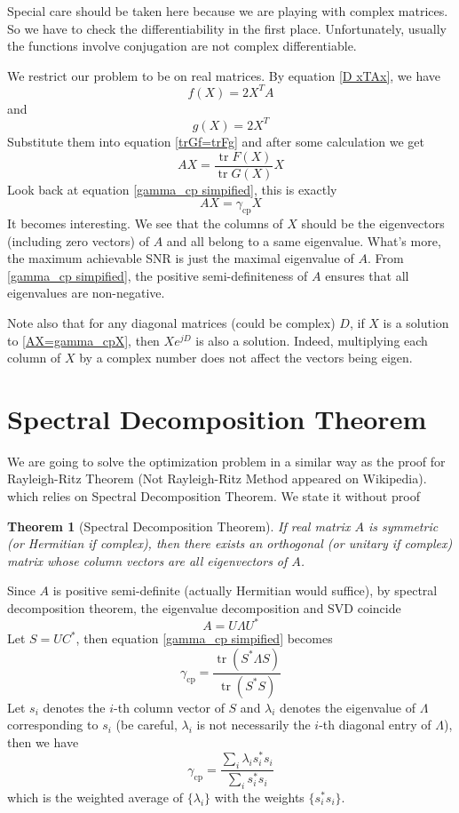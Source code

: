 \documentclass[12pt]{article}
\newtheorem{theorem}{Theorem}
\theoremstyle{definition}
\DeclareMathOperator{\tr}{tr} %
\begin{document}
Special care should be taken here because we are playing with complex matrices. So we have to check the differentiability in the first place. Unfortunately, usually the functions involve conjugation are not complex differentiable. 

We restrict our problem to be on real matrices. By equation \ref{D xTAx}, we have
$$
f(X)=2X^TA
$$
and $$g(X)=2X^T$$
Substitute them into equation \ref{trGf=trFg} and after some calculation we get
$$AX=\frac{\tr F(X)}{\tr G(X)}X$$
Look back at equation \ref{gamma_cp simpified}, this is exactly
\begin{equation}
	AX=\gamma_{\mbox{cp}}X\label{AX=gamma_cpX}
\end{equation}
It becomes interesting. We see that the columns of $X$ should be the eigenvectors (including zero vectors) of $A$ and all belong to a same eigenvalue. What's more, the maximum achievable SNR is just the maximal eigenvalue of $A$. From \ref{gamma_cp simpified}, the positive semi-definiteness of $A$ ensures that all eigenvalues are non-negative.

Note also that for any diagonal matrices (could be complex) $D$, if $X$ is a solution to \ref{AX=gamma_cpX}, then $Xe^{jD}$ is also a solution. Indeed, multiplying each column of $X$ by a complex number does not affect the vectors being eigen.
\section{Spectral Decomposition Theorem}

We are going to solve the optimization problem in a similar way as the proof for Rayleigh-Ritz Theorem (Not Rayleigh-Ritz Method appeared on Wikipedia). which relies on Spectral Decomposition Theorem. We state it without proof
\begin{theorem}[Spectral Decomposition Theorem]
	If real matrix $A$ is symmetric (or Hermitian if complex), then there exists an orthogonal (or unitary if complex) matrix whose column vectors are all eigenvectors of $A$.  
\end{theorem}

Since $A$ is positive semi-definite (actually Hermitian would suffice), by spectral decomposition theorem, the eigenvalue decomposition and SVD coincide
$$A=U\Lambda U^*$$
Let $S=UC^*$, then equation \ref{gamma_cp simpified} becomes
$$\gamma_{\mbox{cp}}=\frac{\tr(S^*\Lambda S)}{\tr(S^*S)}$$
Let $s_i$ denotes the $i$-th column vector of $S$ and $\lambda_i$ denotes the eigenvalue of $\Lambda$ corresponding to $s_i$ (be careful, $\lambda_i$ is not necessarily the $i$-th diagonal entry of $\Lambda$), then we have
$$\gamma_{\mbox{cp}}=\frac{\sum_i\lambda_is_i^*s_i}{\sum_is_i^*s_i}$$ 
which is the weighted average of $\{\lambda_i\}$ with the weights $\{s_i^*s_i\}$.
\end{document}

